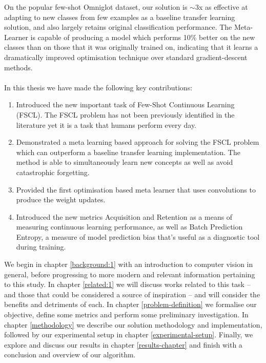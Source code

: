 \documentclass{report}
\begin{document}
On the popular few-shot Omniglot\parencite{omniglot} dataset, our solution is $\sim$3x as effective at adapting to new classes from few examples as a baseline transfer learning solution, and also largely retains original classification performance. The Meta-Learner is capable of producing a model which performs 10\% better on the new classes than on those that it was originally trained on, indicating that it learns a dramatically improved optimisation technique over standard gradient-descent methods.  \\ \\

In this thesis we have made the following key contributions:
\begin{enumerate}
	\item Introduced the new important task of Few-Shot Continuous Learning (FSCL). The FSCL problem has not been previously identified in the literature yet it is a task that humans perform every day.
	\item Demonstrated a meta learning based approach for solving the FSCL problem which can outperform a baseline transfer learning implementation. The method is able to simultaneously learn new concepts as well as avoid catastrophic forgetting.
	\item Provided the first optimisation based meta learner that uses convolutions to produce the weight updates.
	\item Introduced the new metrics Acquisition and Retention as a means of measuring continuous learning performance, as well as Batch Prediction Entropy, a measure of model prediction bias that's useful as a diagnostic tool during training.
\end{enumerate}



We begin in chapter \ref{background:1} with an introduction to computer vision in general, before progressing to more modern and relevant information pertaining to this study. In chapter \ref{related:1} we will discuss works related to this task -- and those that could be considered a source of inspiration -- and will consider the benefits and detriments of each. In chapter \ref{problem-definition} we formalise our objective, define some metrics and perform some preliminary investigation. In chapter \ref{methodology} we describe our solution methodology and implementation, followed by our experimental setup in chapter \ref{experimental-setup}. Finally, we explore and discuss our results in chapter \ref{results-chapter} and finish with a conclusion and overview of our algorithm. \par
\end{document}
